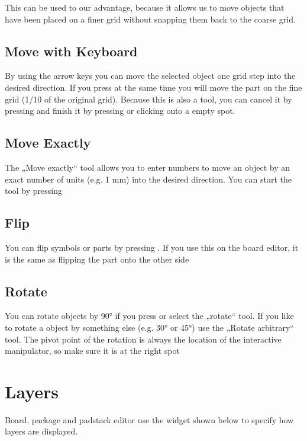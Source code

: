 \documentclass[letterpaper,10pt,czech]{sphinxmanual}
\begin{document}
This can be used to our advantage, because it allows us to move objects that have been placed on a finer grid without snapping them back to the coarse grid.


\section{Move with Keyboard}
\label{\detokenize{move:move-with-keyboard}}
By using the  arrow keys you can move the selected object one grid step into the desired direction. If you press  at the same time you will move the part on the fine grid (1/10 of the original grid). Because this is also a tool, you can cancel it by pressing  and finish it by pressing  or clicking onto a empty spot.


\section{Move Exactly}
\label{\detokenize{move:move-exactly}}
The „Move exactly“ tool allows you to enter numbers to move an object by an exact number of units (e.g. 1 mm) into the desired direction. You can start the tool by pressing 


\section{Flip}
\label{\detokenize{move:flip}}
You can flip symbols or parts by pressing . If you use this on the board editor, it is the same as flipping the part onto the other side


\section{Rotate}
\label{\detokenize{move:rotate}}
You can rotate objects by 90° if you press  or select the „rotate“ tool. If you like to rotate a object by something else (e.g. 30° or 45°) use the „Rotate arbitrary“ tool. The pivot point of the rotation is always the location of the interactive manipulator, so make sure it is at the right spot


\chapter{Layers}
\label{\detokenize{layers:layers}}\label{\detokenize{layers::doc}}
Board, package and padstack editor use the widget shown below to specify how layers are displayed.
\end{document}
